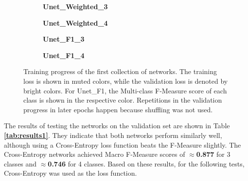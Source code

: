 \begin {figure}[!ht]
	\begin {subfigure}[b]{0.4\linewidth}
		\scalebox{0.685}{}
		\caption{\textbf{Unet\_Weighted\_3}}
	\end {subfigure}\hspace{1.3cm}
	\begin {subfigure}[b]{0.4\linewidth}
		\scalebox{0.70}{}
		\caption{\textbf{Unet\_Weighted\_4}}
	\end {subfigure}

	\begin {subfigure}[b]{0.4\linewidth}
		\scalebox{0.70}{}
		\caption{\textbf{Unet\_F1\_3}}
	\end {subfigure}\hspace{1.3cm}
	\begin {subfigure}[b]{0.4\linewidth}
		\scalebox{0.675}{}
		\caption{\textbf{Unet\_F1\_4}}
	\end {subfigure}

		\caption[]{Training progress of the first collection of networks. The training loss is shown in muted colors, while the validation loss is denoted by bright colors. For Unet\_F1, the Multi-class F-Measure score of each class is shown in the respective color. Repetitions in the validation progress in later epochs happen because shuffling was not used.}
		\label{fig:weighted_f1_training}
\end {figure}

\noindent The results of testing the networks on the validation set are shown in Table \textbf{\ref{tab:results1}}. They indicate that both networks perform similarly well, although using a Cross-Entropy loss function beats the F-Measure slightly. The Cross-Entropy networks achieved Macro F-Measure scores of $\approx$\textbf{0.877} for 3 classes and $\approx$\textbf{0.746} for 4 classes. Based on these results, for the following tests, Cross-Entropy was used as the loss function.\\ 

